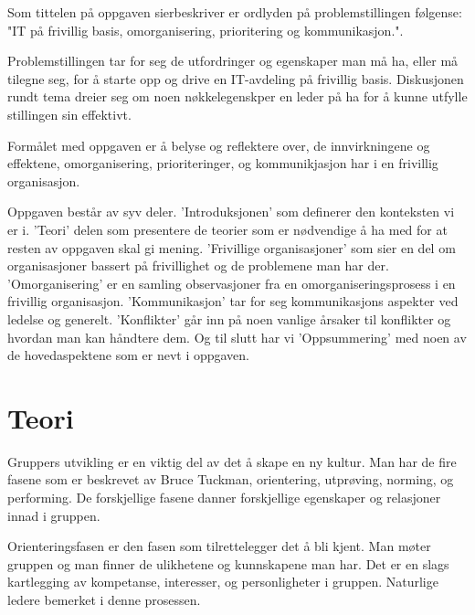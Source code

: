 \documentclass[12pt, a4paper]{article}
\begin{document}

Som tittelen på oppgaven sierbeskriver er ordlyden på problemstillingen
følgense: "IT på frivillig basis, omorganisering, prioritering og
kommunikasjon.". 

Problemstillingen tar for seg de utfordringer og egenskaper man må ha, eller
må tilegne seg, for å starte opp og drive en IT-avdeling på frivillig basis. 
Diskusjonen rundt tema dreier seg om noen nøkkelegenskper en leder på ha
for å kunne utfylle stillingen sin effektivt. 

Formålet med oppgaven er å belyse og reflektere over, de innvirkningene og
effektene, omorganisering, prioriteringer, og kommunikjasjon har i en frivillig
organisasjon.  

Oppgaven består av syv deler. 'Introduksjonen' som definerer den konteksten vi er
i. 'Teori' delen som presentere de teorier som er nødvendige å ha med for at
resten av oppgaven skal gi mening. 'Frivillige organisasjoner' som sier en del
om organisasjoner bassert på frivillighet og de problemene man har der.
'Omorganisering' er en samling observasjoner fra en omorganiseringsprosess i en
frivillig organisasjon. 'Kommunikasjon' tar for seg kommunikasjons aspekter ved
ledelse og generelt. 'Konflikter' går inn på noen vanlige årsaker til
konflikter og hvordan man kan håndtere dem. Og til slutt har vi
'Oppsummering' med noen av de hovedaspektene som er nevt i oppgaven. 

\section{Teori}\label{tidligere arbeid}
Gruppers utvikling er en viktig del av det å skape en ny kultur. Man har de
fire fasene som er beskrevet av Bruce Tuckman, orientering, utprøving, norming,
og performing. De forskjellige fasene danner forskjellige egenskaper og
relasjoner innad i gruppen. 
\cite[]{teamet}

Orienteringsfasen er den fasen som tilrettelegger det å bli kjent. Man møter
gruppen og man finner de ulikhetene og kunnskapene man har. Det er en slags
kartlegging av kompetanse, interesser, og personligheter i gruppen. Naturlige
ledere bemerket i denne prosessen. 
\end{document}
